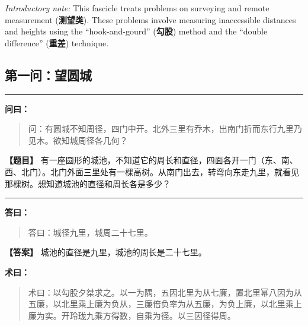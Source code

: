 \documentclass[11pt,a4paper]{article}
\newenvironment{mathproblem}[1][]{%
  \medskip\noindent\rule{\textwidth}{0.4pt}%
  \par\noindent{\Large\bfseries\color{sectioncolor}#1}\par\nopagebreak%
  \smallskip%
}{%
  \par\noindent\rule{\textwidth}{0.4pt}\medskip%
}
\newcommand{\wenlabel}{\textbf{\color{origcolor}问曰：}}
\newcommand{\dalabel}{\textbf{\color{origcolor}答曰：}}
\newcommand{\shulabel}{\textbf{\color{origcolor}术曰：}}
\newcommand{\modwenlabel}{\textbf{\color{modcolor}【题目】}}
\newcommand{\moddalabel}{\textbf{\color{modcolor}【答案】}}
\begin{document}
\noindent\textit{Introductory note:} This fascicle treats problems on 
surveying and remote measurement (\textbf{测望类}). These problems involve measuring 
inaccessible distances and heights using the ``hook-and-gourd'' (\textbf{勾股}) 
method and the ``double difference'' (\textbf{重差}) technique.

\subsection*{第一问：望圆城}

\begin{mathproblem}[\textbf{第一问：望圆城}]

\begin{originaltext}
\wenlabel
\begin{quote}
\textcolor{origcolor}{%
问：有圆城不知周径，四门中开。北外三里有乔木，出南门折而东行九里乃见木。欲知城周径各几何？
}
\end{quote}
\end{originaltext}

\begin{moderntext}
\modwenlabel
有一座圆形的城池，不知道它的周长和直径，四面各开一门（东、南、西、北门）。北门外面三里处有一棵高树。从南门出去，转弯向东走九里，就看见那棵树。想知道城池的直径和周长各是多少？
\end{moderntext}

\end{mathproblem}

\begin{originaltext}
\dalabel
\begin{quote}
\textcolor{origcolor}{%
答曰：城径九里，城周二十七里。
}
\end{quote}
\end{originaltext}

\begin{moderntext}
\moddalabel
城池的直径是九里，城池的周长是二十七里。
\end{moderntext}

\begin{originaltext}
\shulabel
\begin{quote}
\textcolor{origcolor}{%
术曰：以勾股夕桀求之。以一为隅，五因北里为从七廉，置北里幂八因为从五廉，以北里乘上廉为负从，三廉倍负率为从五廉，为负上廉，以北里乘上廉为实。开玲珑九乘方得数，自乘为径。以三因径得周。
}
\end{quote}
\end{originaltext}
\end{document}
